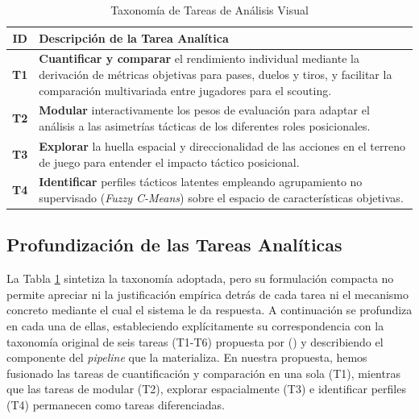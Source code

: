 \documentclass[conference]{IEEEtran}
\begin{document}
\begin{table}[H]
\centering
\caption{Taxonomía de Tareas de Análisis Visual}
\label{tab:tareas_analisis}
\renewcommand{\arraystretch}{1.3}
\begin{tabular}{@{}c p{7cm}@{}}
\toprule
\textbf{ID} & \textbf{Descripción de la Tarea Analítica} \\ \midrule
\textbf{T1} & \textbf{Cuantificar y comparar} el rendimiento individual mediante la derivación de métricas objetivas para pases, duelos y tiros, y facilitar la comparación multivariada entre jugadores para el scouting. \\
\textbf{T2} & \textbf{Modular} interactivamente los pesos de evaluación para adaptar el análisis a las asimetrías tácticas de los diferentes roles posicionales. \\
\textbf{T3} & \textbf{Explorar} la huella espacial y direccionalidad de las acciones en el terreno de juego para entender el impacto táctico posicional. \\
\textbf{T4} & \textbf{Identificar} perfiles tácticos latentes empleando agrupamiento no supervisado (\textit{Fuzzy C-Means}) sobre el espacio de características objetivas. \\ \bottomrule
\end{tabular}
\end{table}

\subsection{Profundización de las Tareas Analíticas}
\label{subsec:tareas_profundizacion}

La Tabla \ref{tab:tareas_analisis} sintetiza la taxonomía adoptada, pero su formulación compacta no permite apreciar ni la justificación empírica detrás de cada tarea ni el mecanismo concreto mediante el cual el sistema le da respuesta. A continuación se profundiza en cada una de ellas, estableciendo explícitamente su correspondencia con la taxonomía original de seis tareas (T1-T6) propuesta por \citeauthor{evers2024visual} (\citeyear{evers2024visual}) y describiendo el componente del \textit{pipeline} que la materializa. En nuestra propuesta, hemos fusionado las tareas de cuantificación y comparación en una sola (T1), mientras que las tareas de modular (T2), explorar espacialmente (T3) e identificar perfiles (T4) permanecen como tareas diferenciadas.
\end{document}

